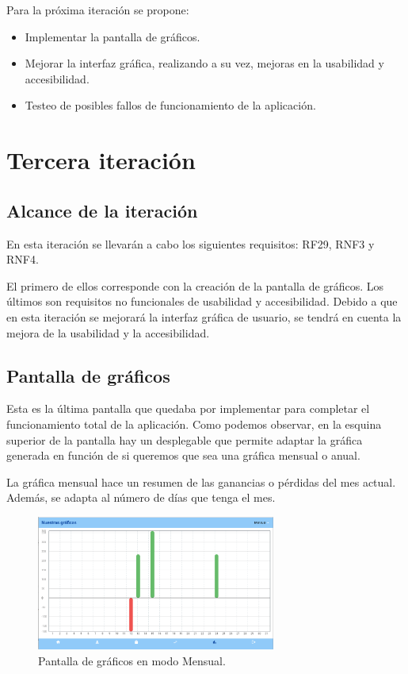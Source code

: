 Para la próxima iteración se propone: 

\begin{itemize}
	\item Implementar la pantalla de gráficos.
	\item Mejorar la interfaz gráfica, realizando a su vez, mejoras en la usabilidad y accesibilidad.
	\item Testeo de posibles fallos de funcionamiento de la aplicación.
\end{itemize}

\section{Tercera iteración}

\subsection{Alcance de la iteración}

En esta iteración se llevarán a cabo los siguientes requisitos: RF29, RNF3 y RNF4. 

El primero de ellos corresponde con la creación de la pantalla de gráficos. Los últimos son requisitos no funcionales de usabilidad y accesibilidad. Debido a que en esta iteración se mejorará la interfaz gráfica de usuario, se tendrá en cuenta la mejora de la usabilidad y la accesibilidad. 

\subsection{Pantalla de gráficos}

Esta es la última pantalla que quedaba por implementar para completar el funcionamiento total de la aplicación. Como podemos observar, en la esquina superior de la pantalla hay un desplegable que permite adaptar la gráfica generada en función de si queremos que sea una gráfica mensual o anual. 

La gráfica mensual hace un resumen de las ganancias o pérdidas del mes actual. Además, se adapta al número de días que tenga el mes. 


\begin{figure}[H]
	\centering
	\includegraphics[width=0.7\textwidth]{imagenes/TerceraIteracion/graficosMensual.png}
	\caption{Pantalla de gráficos en modo Mensual.}
	\label{fig:mensual}
\end{figure}

